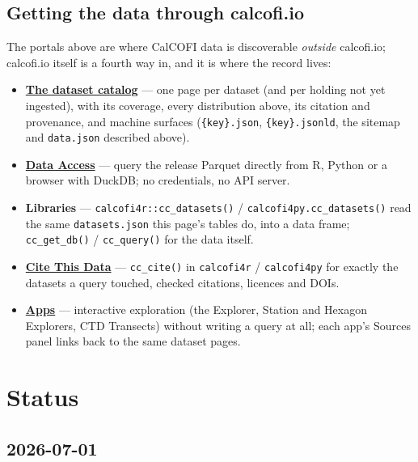 \documentclass[
  letterpaper,
  DIV=11,
  numbers=noendperiod]{scrreprt}
\providecommand{\tightlist}{%
  \setlength{\itemsep}{0pt}\setlength{\parskip}{0pt}}
\begin{document}
\section{Getting the data through
calcofi.io}\label{getting-the-data-through-calcofi.io}

The portals above are where CalCOFI data is discoverable \emph{outside}
calcofi.io; calcofi.io itself is a fourth way in, and it is where the
record lives:

\begin{itemize}
\tightlist
\item
  \textbf{\href{https://calcofi.io/datasets/}{The dataset catalog}} ---
  one page per dataset (and per holding not yet ingested), with its
  coverage, every distribution above, its citation and provenance, and
  machine surfaces (\texttt{\{key\}.json}, \texttt{\{key\}.jsonld}, the
  sitemap and \texttt{data.json} described above).
\item
  \textbf{\hyperref[data-access]{Data Access}} --- query the release
  Parquet directly from R, Python or a browser with DuckDB; no
  credentials, no API server.
\item
  \textbf{Libraries} --- \texttt{calcofi4r::cc\_datasets()} /
  \texttt{calcofi4py.cc\_datasets()} read the same
  \texttt{datasets.json} this page's tables do, into a data frame;
  \texttt{cc\_get\_db()} / \texttt{cc\_query()} for the data itself.
\item
  \textbf{\hyperref[cite-this-data]{Cite This Data}} ---
  \texttt{cc\_cite()} in \texttt{calcofi4r} / \texttt{calcofi4py} for
  exactly the datasets a query touched, checked citations, licences and
  DOIs.
\item
  \textbf{\hyperref[applications]{Apps}} --- interactive exploration
  (the Explorer, Station and Hexagon Explorers, CTD Transects) without
  writing a query at all; each app's Sources panel links back to the
  same dataset pages.
\end{itemize}


\chapter{Status}\label{status}

\section{2026-07-01}\label{section}
\end{document}
